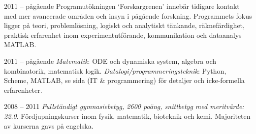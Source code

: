 
      {2011 -- pågående}
      {Programutökningen `Forskargrenen' innebär tidigare kontakt med mer
       avancerade områden och insyn i pågående forskning. Programmets fokus
       ligger på teori, problemlösning, logiskt och analytiskt tänkande,
       räknefärdighet, praktisk erfarenhet inom experimentutförande,
       kommunikation och dataanalys MATLAB.}

      {2011 -- pågående}
      {\textit{Matematik}: ODE och dynamiska system, algebra och kombinatorik,
       matematisk logik. \textit{Datalogi/programmeringsteknik}:
       Python, Scheme, MATLAB, se sida \pageref{programming} (IT \& programmering)
       för detaljer och icke-formella erfarenheter.}

      {2008 -- 2011}
      {\textit{Fullständigt gymnasiebetyg, 2600 poäng, snittbetyg med
       meritvärde: 22.0}. Fördjupningskurser inom fysik, matematik,
       bioteknik och kemi. Majoriteten av kurserna gavs på engelska.}
